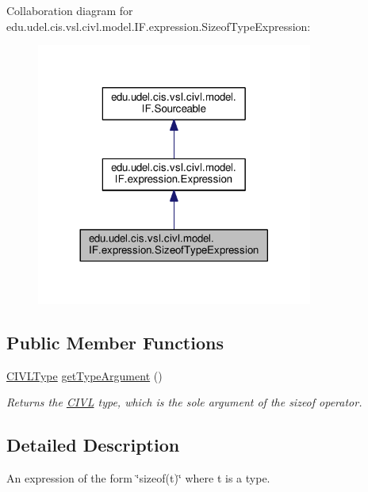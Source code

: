 Collaboration diagram for edu.\+udel.\+cis.\+vsl.\+civl.\+model.\+I\+F.\+expression.\+Sizeof\+Type\+Expression\+:
\nopagebreak
\begin{figure}[H]
\begin{center}
\leavevmode
\includegraphics[width=257pt]{interfaceedu_1_1udel_1_1cis_1_1vsl_1_1civl_1_1model_1_1IF_1_1expression_1_1SizeofTypeExpression__coll__graph}
\end{center}
\end{figure}
\subsection*{Public Member Functions}
\begin{DoxyCompactItemize}
\item 
\hyperlink{interfaceedu_1_1udel_1_1cis_1_1vsl_1_1civl_1_1model_1_1IF_1_1type_1_1CIVLType}{C\+I\+V\+L\+Type} \hyperlink{interfaceedu_1_1udel_1_1cis_1_1vsl_1_1civl_1_1model_1_1IF_1_1expression_1_1SizeofTypeExpression_a130a72700dd92c3c3824b70f7bd7a77d}{get\+Type\+Argument} ()
\begin{DoxyCompactList}\small\item\em Returns the \hyperlink{classedu_1_1udel_1_1cis_1_1vsl_1_1civl_1_1CIVL}{C\+I\+V\+L} type, which is the sole argument of the sizeof operator. \end{DoxyCompactList}\end{DoxyCompactItemize}


\subsection{Detailed Description}
An expression of the form \char`\"{}sizeof(t)\char`\"{} where t is a type. 

